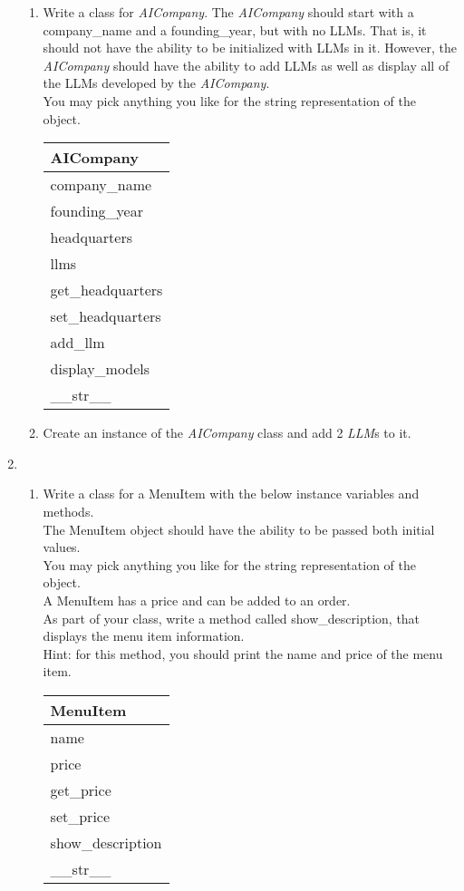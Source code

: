 \documentclass{article}
\begin{document}
\begin{enumerate}
\begin{enumerate}
		\item 
			Write a class for \textit{AICompany}. The \textit{AICompany} should start
			with a company\_name and a founding\_year, but with no LLMs. That is, it should
			not have the ability to be initialized with LLMs in it. However, the
			\textit{AICompany} should have the ability to add LLMs as well as display all of the
			LLMs developed by the \textit{AICompany}.\\
			You may pick anything you like for the string representation of the object.
			\begin{flushright}
			\begin{tabular}{|l|} \hline 
				AICompany\\ \hline
				company\_name\\ founding\_year \\ headquarters \\ llms\\ \hline
				get\_headquarters\\ set\_headquarters\\ add\_llm\\ display\_models\\ 
					\_\_str\_\_ \\ \hline
			\end{tabular}
			\end{flushright}

		\item
			Create an instance of the \textit{AICompany} class and add 2 \textit{LLM}s to it.
	\end{enumerate}
\pagebreak



	\item
	\begin{enumerate}
		\item
			Write a class for a MenuItem with the below instance variables and methods.\\ 
			The MenuItem object should have the ability to be passed both initial values.\\  
			You may pick anything you like for the string representation of the object.\\
			A MenuItem has a price and can be added to an order.\\  
			As part of your class, write a method called show\_description, that displays the menu item information.\\
			Hint: for this method, you should print the name and price of the menu item.
			\begin{flushright}
			\begin{tabular}{|l|}
				\hline
				MenuItem\\ \hline
				name\\	price\\	 \hline
				get\_price \\ set\_price \\ show\_description \\ \_\_str\_\_ \\ \hline
			\end{tabular}
			\end{flushright}


\end{enumerate}
\end{enumerate}
\end{document}
